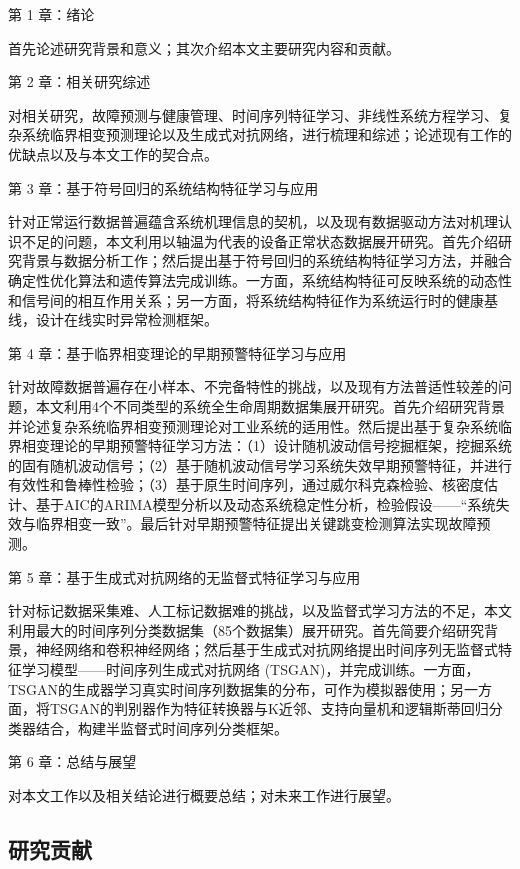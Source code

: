 第 1 章：绪论
	
首先论述研究背景和意义；其次介绍本文主要研究内容和贡献。

第 2 章：相关研究综述

对相关研究，故障预测与健康管理、时间序列特征学习、非线性系统方程学习、复杂系统临界相变预测理论以及生成式对抗网络，进行梳理和综述；论述现有工作的优缺点以及与本文工作的契合点。

第 3 章：基于符号回归的系统结构特征学习与应用

针对正常运行数据普遍蕴含系统机理信息的契机，以及现有数据驱动方法对机理认识不足的问题，本文利用以轴温为代表的设备正常状态数据展开研究。首先介绍研究背景与数据分析工作；然后提出基于符号回归的系统结构特征学习方法，并融合确定性优化算法和遗传算法完成训练。一方面，系统结构特征可反映系统的动态性和信号间的相互作用关系；另一方面，将系统结构特征作为系统运行时的健康基线，设计在线实时异常检测框架。

第 4 章：基于临界相变理论的早期预警特征学习与应用

针对故障数据普遍存在小样本、不完备特性的挑战，以及现有方法普适性较差的问题，本文利用4个不同类型的系统全生命周期数据集展开研究。首先介绍研究背景并论述复杂系统临界相变预测理论对工业系统的适用性。然后提出基于复杂系统临界相变理论的早期预警特征学习方法：（1）设计随机波动信号挖掘框架，挖掘系统的固有随机波动信号；（2）基于随机波动信号学习系统失效早期预警特征，并进行有效性和鲁棒性检验；（3）基于原生时间序列，通过威尔科克森检验、核密度估计、基于AIC的ARIMA模型分析以及动态系统稳定性分析，检验假设——“系统失效与临界相变一致”。最后针对早期预警特征提出关键跳变检测算法实现故障预测。

第 5 章：基于生成式对抗网络的无监督式特征学习与应用

针对标记数据采集难、人工标记数据难的挑战，以及监督式学习方法的不足，本文利用最大的时间序列分类数据集（85个数据集）展开研究。首先简要介绍研究背景，神经网络和卷积神经网络；然后基于生成式对抗网络提出时间序列无监督式特征学习模型——时间序列生成式对抗网络 (TSGAN)，并完成训练。一方面，TSGAN的生成器学习真实时间序列数据集的分布，可作为模拟器使用；另一方面，将TSGAN的判别器作为特征转换器与K近邻、支持向量机和逻辑斯蒂回归分类器结合，构建半监督式时间序列分类框架。

第 6 章：总结与展望

对本文工作以及相关结论进行概要总结；对未来工作进行展望。

\subsection{研究贡献}

